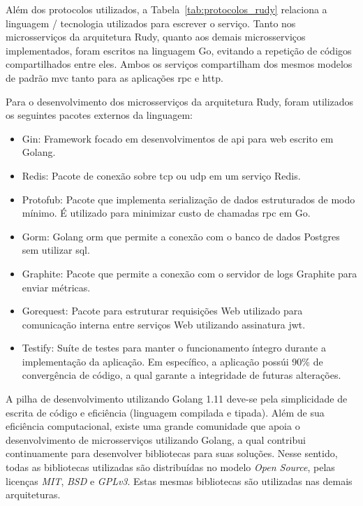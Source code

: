 Além dos protocolos utilizados, a Tabela~\ref{tab:protocolos_rudy} relaciona a linguagem / tecnologia utilizados para escrever o serviço.
%
Tanto nos microsserviços da arquitetura Rudy, quanto aos demais microsserviços implementados, foram escritos na linguagem Go, evitando a repetição de códigos compartilhados entre eles.
%
Ambos os serviços compartilham dos mesmos modelos de padrão \ac{mvc} tanto para as aplicações \ac{rpc} e \ac{http}.

Para o desenvolvimento dos microsserviços da arquitetura Rudy, foram utilizados os seguintes pacotes externos da linguagem:

\begin{itemize}
    \item Gin: Framework focado em desenvolvimentos de \ac{api} para web escrito em Golang.
    \item Redis: Pacote de conexão sobre \ac{tcp} ou \ac{udp} em um serviço Redis.
    \item Protofub: Pacote que implementa serialização de dados estruturados de modo mínimo. É utilizado para minimizar custo de chamadas \ac{rpc} em Go.
    \item Gorm: Golang \ac{orm} que permite a conexão com o banco de dados Postgres sem utilizar \ac{sql}.
    \item Graphite: Pacote que permite a conexão com o servidor de logs Graphite para enviar métricas.
    \item Gorequest: Pacote para estruturar requisições Web utilizado para comunicação interna entre serviços Web utilizando assinatura \ac{jwt}.
    \item Testify: Suíte de testes para manter o funcionamento íntegro durante a implementação da aplicação. Em específico, a aplicação possúi 90\% de convergência de código, a qual garante a integridade de futuras alterações.
\end{itemize}

A pilha de desenvolvimento utilizando Golang 1.11 deve-se pela simplicidade de escrita de código e eficiência (linguagem compilada e tipada).
%
Além de sua eficiência computacional, existe uma grande comunidade que apoia o desenvolvimento de microsserviços utilizando Golang, a qual contribui continuamente para desenvolver bibliotecas para suas soluções.
%
Nesse sentido, todas as bibliotecas utilizadas são distribuídas no modelo \textit{Open Source}, pelas licenças \textit{MIT}, \textit{BSD} e \textit{GPLv3}.
%
Estas mesmas bibliotecas são utilizadas nas demais arquiteturas.

